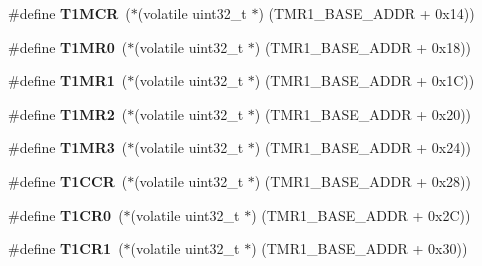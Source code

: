 \begin{DoxyCompactItemize}
\mbox{\label{group__lpc24xx__regs_ga205889a7afd857ad3eb141308850f3f5}} 
\#define {\bfseries T1\+M\+CR}~($\ast$(volatile uint32\+\_\+t $\ast$) (T\+M\+R1\+\_\+\+B\+A\+S\+E\+\_\+\+A\+D\+DR + 0x14))
\item 
\mbox{\label{group__lpc24xx__regs_gaf5ba753d0f5e3768bf5ffef897b9c409}} 
\#define {\bfseries T1\+M\+R0}~($\ast$(volatile uint32\+\_\+t $\ast$) (T\+M\+R1\+\_\+\+B\+A\+S\+E\+\_\+\+A\+D\+DR + 0x18))
\item 
\mbox{\label{group__lpc24xx__regs_ga7edccdd1ca49c9cf4bdd1b2992ce1583}} 
\#define {\bfseries T1\+M\+R1}~($\ast$(volatile uint32\+\_\+t $\ast$) (T\+M\+R1\+\_\+\+B\+A\+S\+E\+\_\+\+A\+D\+DR + 0x1\+C))
\item 
\mbox{\label{group__lpc24xx__regs_ga8ea913f8ea4a5c82d24c9746ccb667bf}} 
\#define {\bfseries T1\+M\+R2}~($\ast$(volatile uint32\+\_\+t $\ast$) (T\+M\+R1\+\_\+\+B\+A\+S\+E\+\_\+\+A\+D\+DR + 0x20))
\item 
\mbox{\label{group__lpc24xx__regs_ga7fea7562f22aa7455803cf9b33ecce5a}} 
\#define {\bfseries T1\+M\+R3}~($\ast$(volatile uint32\+\_\+t $\ast$) (T\+M\+R1\+\_\+\+B\+A\+S\+E\+\_\+\+A\+D\+DR + 0x24))
\item 
\mbox{\label{group__lpc24xx__regs_ga737ee7b9cfbee8d3bbb0abf66a34b9b5}} 
\#define {\bfseries T1\+C\+CR}~($\ast$(volatile uint32\+\_\+t $\ast$) (T\+M\+R1\+\_\+\+B\+A\+S\+E\+\_\+\+A\+D\+DR + 0x28))
\item 
\mbox{\label{group__lpc24xx__regs_gaada37f1a99a649cc0b1b7cba92119cec}} 
\#define {\bfseries T1\+C\+R0}~($\ast$(volatile uint32\+\_\+t $\ast$) (T\+M\+R1\+\_\+\+B\+A\+S\+E\+\_\+\+A\+D\+DR + 0x2\+C))
\item 
\mbox{\label{group__lpc24xx__regs_gad8140e19bb354413b32f222d2d6ac6dd}} 
\#define {\bfseries T1\+C\+R1}~($\ast$(volatile uint32\+\_\+t $\ast$) (T\+M\+R1\+\_\+\+B\+A\+S\+E\+\_\+\+A\+D\+DR + 0x30))
\item 
\mbox{\label{group__lpc24xx__regs_gaddb430d719c637f754d70783953986a7}} 

\end{DoxyCompactItemize}
